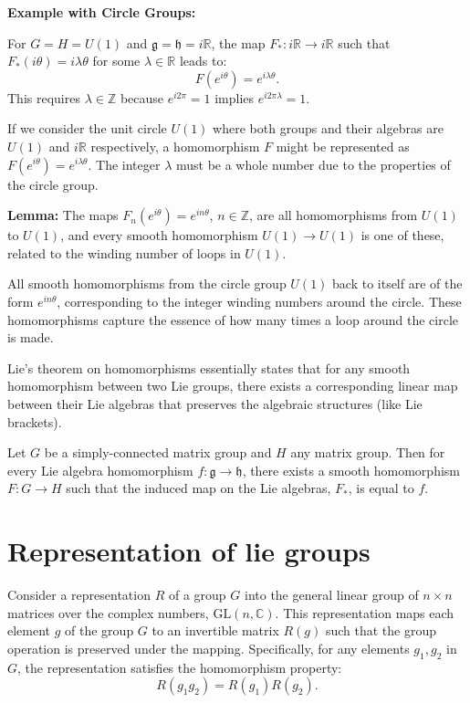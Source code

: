 \documentclass{article}
\begin{document}
\textbf{Example with Circle Groups:}

For \( G = H = U(1) \) and \( \mathfrak{g} = \mathfrak{h} = i\mathbb{R} \), the map \( F_*: i\mathbb{R} \to i\mathbb{R} \) such that \( F_*(i\theta) = i\lambda \theta \) for some \( \lambda \in \mathbb{R} \) leads to:
\[
F(e^{i\theta}) = e^{i\lambda \theta}.
\]
This requires \( \lambda \in \mathbb{Z} \) because \( e^{i2\pi} = 1 \) implies \( e^{i2\pi \lambda} = 1 \).

If we consider the unit circle \( U(1) \) where both groups and their algebras are \( U(1) \) and \( i\mathbb{R} \) respectively, a homomorphism \( F \) might be represented as \( F(e^{i\theta}) = e^{i\lambda\theta} \). The integer \( \lambda \) must be a whole number due to the properties of the circle group.

\textbf{Lemma:}
The maps \( F_n(e^{i\theta}) = e^{in\theta} \), \( n \in \mathbb{Z} \), are all homomorphisms from \( U(1) \) to \( U(1) \), and every smooth homomorphism \( U(1) \to U(1) \) is one of these, related to the winding number of loops in \( U(1) \).  


All smooth homomorphisms from the circle group \( U(1) \) back to itself are of the form \( e^{in\theta} \), corresponding to the integer winding numbers around the circle. These homomorphisms capture the essence of how many times a loop around the circle is made.

Lie's theorem on homomorphisms essentially states that for any smooth homomorphism between two Lie groups, there exists a corresponding linear map between their Lie algebras that preserves the algebraic structures (like Lie brackets).

\begin{theorem}
Let \( G \) be a simply-connected matrix group and \( H \) any matrix group. Then for every Lie algebra homomorphism \( f: \mathfrak{g} \to \mathfrak{h} \), there exists a smooth homomorphism \( F: G \to H \) such that the induced map on the Lie algebras, \( F_* \), is equal to \( f \).
\end{theorem}

\section{Representation of lie groups}

Consider a representation \( R \) of a group \( G \) into the general linear group of \( n \times n \) matrices over the complex numbers, \( \text{GL}(n, \mathbb{C}) \). This representation maps each element \( g \) of the group \( G \) to an invertible matrix \( R(g) \) such that the group operation is preserved under the mapping. Specifically, for any elements \( g_1, g_2 \) in \( G \), the representation satisfies the homomorphism property:
\[
R(g_1 g_2) = R(g_1) R(g_2).
\]
\end{document}
